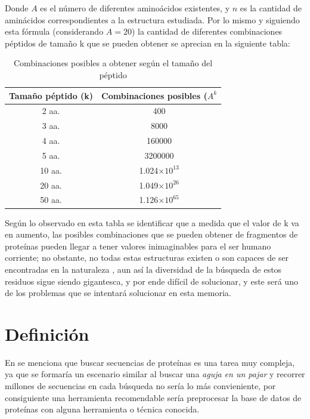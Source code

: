 Donde $A$ es el número de diferentes aminoácidos existentes, y $n$ es la cantidad de aminácidos correspondientes a la estructura estudiada. Por lo mismo y siguiendo esta fórmula (considerando $A=20$) la cantidad de diferentes combinaciones péptidos de tamaño k que se pueden obtener se aprecian en la siguiente tabla:

\begin{table}[H]
\centering
\label{my-label2}
\begin{tabular}{|c|c|}
\hline
Tamaño péptido (k) & \multicolumn{1}{c|}{Combinaciones posibles ($A^{k}$}  \\ \hline
2 aa.     & 400        \\
3 aa.     & 8000                         \\
4 aa.      &      160000                             \\
5 aa.      &   3200000       \\
10 aa.      &   1.024$\times 10^{13}$       \\
20 aa.      &   1.049$\times 10^{26}$       \\
50 aa.   &     1.126$\times 10^{65}$   \\ \hline
\end{tabular}
\caption{Combinaciones posibles a obtener según el tamaño del péptido}
\end{table}

Según lo observado en esta tabla se identificar que a medida que el valor de k va en aumento, las posibles combinaciones que se pueden obtener de fragmentos de proteínas pueden llegar a tener valores inimaginables para el ser humano corriente; no obstante, no todas estas estructuras existen o son capaces de ser encontradas en la naturaleza \cite{array}, aun así la diversidad de la búsqueda de estos residuos sigue siendo gigantesca, y por ende difícil de solucionar, y este será uno de los problemas que se intentará solucionar en esta memoria.

\section{Definición}

En \cite{searching} se menciona que buscar secuencias de proteínas es una tarea muy compleja, ya que se formaría un escenario similar al buscar una {\it{aguja en un pajar}} y recorrer millones de secuencias en cada búsqueda no sería lo más convieniente, por consiguiente una herramienta recomendable sería preprocesar la base de datos de proteínas con alguna herramienta o técnica conocida.